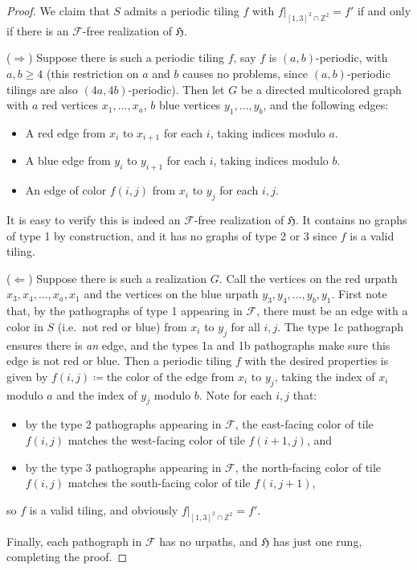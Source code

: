 \documentclass{article}
\newcommand{\Fc}{\mathcal{F}}
\newcommand{\Hf}{\mathfrak{H}}
\newcommand{\Z}{\mathbb{Z}}
\begin{document}
\begin{proof}
We claim that $S$ admits a periodic tiling $f$ with $f|_{[1,3]^2\cap \Z^2}=f'$ if and only if there is an $\Fc$-free realization of $\Hf$.

($\Rightarrow$) Suppose there is such a periodic tiling $f$, say $f$ is $(a,b)$-periodic, with $a,b\ge 4$ (this restriction on $a$ and $b$ causes no problems, since $(a,b)$-periodic tilings are also $(4a,4b)$-periodic). Then let $G$ be a directed multicolored graph with $a$ red vertices $x_1,\dots,x_a$, $b$ blue vertices $y_1,\dots,y_b$, and the following edges:
\begin{itemize}
    \item A red edge from $x_i$ to $x_{i+1}$ for each $i$, taking indices modulo $a$.
    \item A blue edge from $y_i$ to $y_{i+1}$ for each $i$, taking indices modulo $b$.
    \item An edge of color $f(i,j)$ from $x_i$ to $y_j$ for each $i,j$.
\end{itemize}
It is easy to verify this is indeed an $\Fc$-free realization of $\Hf$. It contains no graphs of type 1 by construction, and it has no graphs of type 2 or 3 since $f$ is a valid tiling.

($\Leftarrow$) Suppose there is such a realization $G$. Call the vertices on the red urpath $x_3,x_4,\dots,x_a,x_1$ and the vertices on the blue urpath $y_3,y_4,\dots,y_b,y_1$. First note that, by the pathographs of type 1 appearing in $\Fc$, there must be an edge with a color in $S$ (i.e.\ not red or blue) from $x_i$ to $y_j$ for all $i,j$. The type 1c pathograph ensures there is \textit{an} edge, and the types 1a and 1b pathographs make sure this edge is not red or blue. Then a periodic tiling $f$ with the desired properties is given by $f(i,j)\coloneq\text{the color of the edge from $x_i$ to $y_j$}$, taking the index of $x_i$ modulo $a$ and the index of $y_j$ modulo $b$. Note for each $i,j$ that:
\begin{itemize}
    \item by the type 2 pathographs appearing in $\Fc$, the east-facing color of tile $f(i,j)$ matches the west-facing color of tile $f(i+1,j)$, and
    \item by the type 3 pathographs appearing in $\Fc$, the north-facing color of tile $f(i,j)$ matches the south-facing color of tile $f(i,j+1)$,
\end{itemize}
so $f$ is a valid tiling, and obviously $f|_{[1,3]^2\cap \Z^2}=f'$.

Finally, each pathograph in $\Fc$ has no urpaths, and $\Hf$ has just one rung, completing the proof.
\end{proof}
\end{document}
